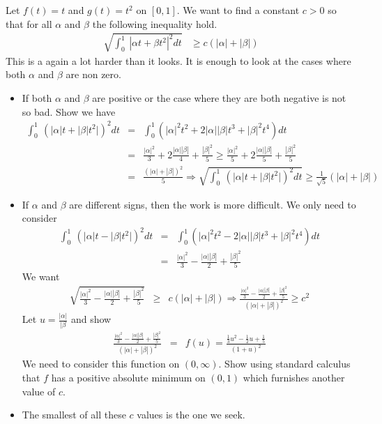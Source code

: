 \documentclass[11pt]{SelfArxOneColBMN}
\begin{document}
\begin{exercise}
Let $f(t) = t$ and $g(t) = t^2$ on $[0,1]$.
We want to find a constant $c>0$ so that for all $\alpha$ and
$\beta$ the following inequality hold.
\begin{eqnarray*}
\sqrt{\int_0^1 \: | \alpha t + \beta t^2|^2 dt} &\geq c( |\alpha| + |\beta|)
\end{eqnarray*}
\noindent
This is a again a lot harder than it looks. It is enough to look at
the cases where both $\alpha$ and $\beta$ are non zero.
\begin{itemize}
\item If both $\alpha$ and $\beta$ are positive or the case
where they are both negative is not so bad.  Show we have
\begin{eqnarray*}
\int_0^1 \: ( |\alpha| t + |\beta| t^2|)^2 dt 
&=&
\int_0^1 ( |\alpha|^2 t^2 + 2 |\alpha| |\beta| t^3 + |\beta|^2 t^4 ) dt\\
&=&
\frac{|\alpha|^2}{3} + 2\frac{|\alpha| |\beta|}{4} + \frac{|\beta|^2}{5}
\geq
\frac{|\alpha|^2}{5} + 2\frac{|\alpha| |\beta|}{5} + \frac{|\beta|^2}{5}\\
&=&
\frac{\left( |\alpha| + |\beta| \right)^2}{5}
\Longrightarrow
\sqrt{\int_0^1 \: ( |\alpha| t + |\beta| t^2|)^2 dt}
\geq \frac{1}{\sqrt{5}} ( |\alpha| + |\beta|)
\end{eqnarray*}
\noindent
\item 
If $\alpha$ and $\beta$ are different signs, then the work is more difficult.
We only need to consider
\begin{eqnarray*}
\int_0^1 \: ( |\alpha| t - |\beta| t^2|)^2 dt 
&=&
\int_0^1 ( |\alpha|^2 t^2 - 2 |\alpha| |\beta| t^3 + |\beta|^2 t^4 ) dt\\
&=&
\frac{|\alpha|^2}{3} - \frac{|\alpha| |\beta|}{2 } + \frac{|\beta|^2}{5}
\end{eqnarray*}
\noindent
We want
\begin{eqnarray*}
\sqrt{\frac{|\alpha|^2}{3} - \frac{|\alpha| |\beta|}{2 } + \frac{|\beta|^2}{5}}
&\geq& c (|\alpha| + |\beta|)
\Longrightarrow
\frac{\frac{|\alpha|^2}{3} - \frac{|\alpha| |\beta|}{2 } + \frac{|\beta|^2}{5}}{(|\alpha| + |\beta|)^2}
\geq c^2
\end{eqnarray*}
\noindent
Let $u = \frac{|\alpha|}{|\beta}$ and show
\begin{eqnarray*}
\frac{\frac{|\alpha|^2}{3} - \frac{|\alpha| |\beta|}{2 } + \frac{|\beta|^2}{5}}{(|\alpha| + |\beta|)^2}
&=& f(u)
= \frac{\frac{1}{3}u^2 - \frac{1}{2}u + \frac{1}{5}}{(1+u)^2}
\end{eqnarray*}
\noindent
We need to consider this function on $(0,\infty)$.  Show using
standard calculus that $f$ has a positive absolute minimum on $(0,1)$
which furnishes another value of $c$.
\item The smallest of all these $c$ values is the one we seek.
\end{itemize}
\end{exercise}
\end{document}
